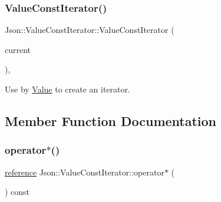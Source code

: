 \subsubsection{\texorpdfstring{Value\+Const\+Iterator()}{ValueConstIterator()}\hspace{0.1cm}{\footnotesize\ttfamily [3/3]}}
{\footnotesize\ttfamily Json\+::\+Value\+Const\+Iterator\+::\+Value\+Const\+Iterator (\begin{DoxyParamCaption}\item[{const Value\+::\+Object\+Values\+::iterator \&}]{current }\end{DoxyParamCaption})\hspace{0.3cm}{\ttfamily [explicit]}, {\ttfamily [private]}}

Use by \hyperlink{classJson_1_1Value}{Value} to create an iterator. 

\subsection{Member Function Documentation}
\mbox{\label{classJson_1_1ValueConstIterator_ae5612dad47a6387eef71d584fb741d0c_ae5612dad47a6387eef71d584fb741d0c}} 
\subsubsection{\texorpdfstring{operator$\ast$()}{operator*()}}
{\footnotesize\ttfamily \hyperlink{classJson_1_1ValueConstIterator_aa9b05c6a37cd352ea1ee6e13b816f709_aa9b05c6a37cd352ea1ee6e13b816f709}{reference} Json\+::\+Value\+Const\+Iterator\+::operator$\ast$ (\begin{DoxyParamCaption}{ }\end{DoxyParamCaption}) const\hspace{0.3cm}{\ttfamily [inline]}}

\mbox{\label{classJson_1_1ValueConstIterator_ab3f0c2edbfc8f7d60645f3d597d05e28_ab3f0c2edbfc8f7d60645f3d597d05e28}} 
